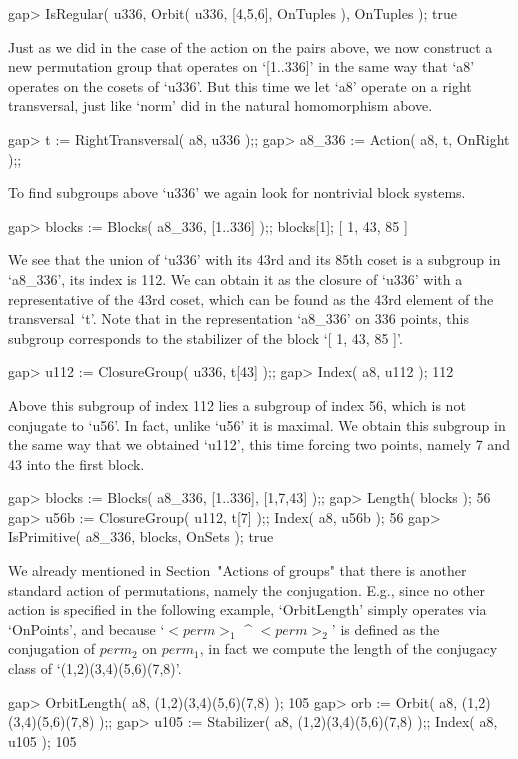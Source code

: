 \beginexample
gap> IsRegular( u336, Orbit( u336, [4,5,6], OnTuples ), OnTuples );
true
\endexample

Just as we did in the  case of the  action on the  pairs above, we now
construct a new permutation group that operates on `[1..336]' in the same
way that `a8' operates on the cosets of `u336'. But this time we let `a8'
operate  on a right   transversal, just like  `norm'  did in  the natural
homomorphism above.

\beginexample
gap> t := RightTransversal( a8, u336 );;
gap> a8_336 := Action( a8, t, OnRight );;
\endexample

To find  subgroups above `u336' we again look for nontrivial block systems.

\beginexample
gap> blocks := Blocks( a8_336, [1..336] );; blocks[1];
[ 1, 43, 85 ]
\endexample

We see that the union of `u336' with its 43rd and its 85th coset
is a subgroup in `a8_336', its index is 112.
We can obtain it as the closure of `u336' with a representative
of the  43rd coset, which can be found as the 43rd element
of the transversal~`t'.
Note that in the representation `a8_336' on 336 points,
this subgroup corresponds to the stabilizer of the block `[ 1, 43, 85 ]'.

\beginexample
gap> u112 := ClosureGroup( u336, t[43] );;
gap> Index( a8, u112 );
112
\endexample

Above this subgroup of index 112 lies a  subgroup  of index 56, which  is
not conjugate to `u56'.  In fact, unlike `u56' it is  maximal.  We obtain
this subgroup in  the same way that we obtained `u112', this time forcing
two points, namely 7 and 43 into the first block.

\beginexample
gap> blocks := Blocks( a8_336, [1..336], [1,7,43] );;
gap> Length( blocks );
56
gap> u56b := ClosureGroup( u112, t[7] );; Index( a8, u56b );
56
gap> IsPrimitive( a8_336, blocks, OnSets );
true
\endexample

We  already mentioned  in Section~"Actions of groups"
that there is another  standard
action of permutations, namely the  conjugation.
E.g., since no  other action is specified  in the  following example,
`OrbitLength' simply operates via `OnPoints',
and because `$<perm>_1$ ^ $<perm>_2$' is defined as the conjugation
of $perm_2$ on $perm_1$, in fact we compute the length of
the conjugacy class of `(1,2)(3,4)(5,6)(7,8)'.

\beginexample
gap> OrbitLength( a8, (1,2)(3,4)(5,6)(7,8) );
105
gap> orb := Orbit( a8, (1,2)(3,4)(5,6)(7,8) );;
gap> u105 := Stabilizer( a8, (1,2)(3,4)(5,6)(7,8) );; Index( a8, u105 );
105
\endexample

